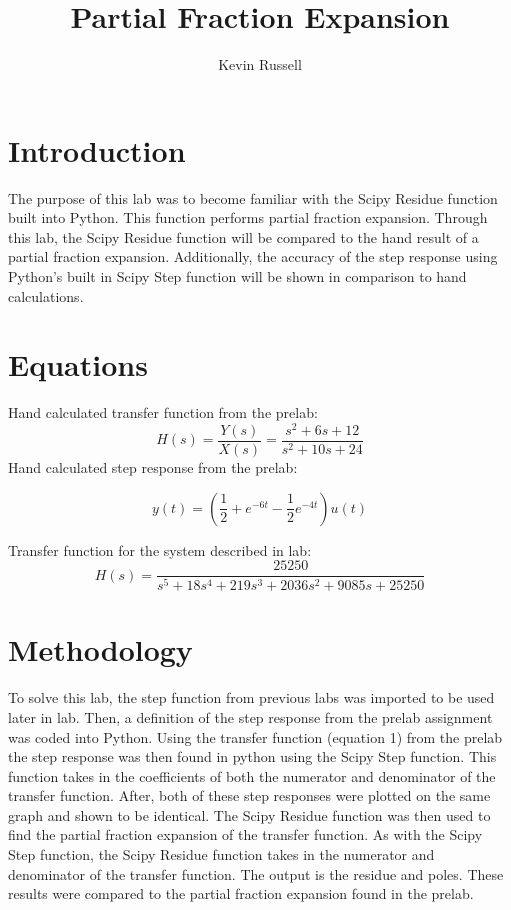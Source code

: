 \documentclass[12pt, titlepage]{article}
\author{Kevin Russell}
\title{Partial Fraction Expansion}
\date{\parbox{\linewidth}{\centering%
  \experimentDate
  \endgraf\bigskip
  \className\ -- Section \sectionNumber\
}}
\begin{document}
 \newpage
	    \maketitle
    
    \newpage
        \tableofcontents
        
   \newpage
        \section{Introduction}
       The purpose of this lab was to become familiar with the Scipy Residue function built into Python.  This function performs partial fraction expansion.  Through this lab, the Scipy Residue function will be compared to the hand result of a partial fraction expansion.  Additionally, the accuracy of the step response using Python's built in Scipy Step function will be shown in comparison to hand calculations.
        
        \section{Equations}
        Hand calculated transfer function from the prelab:
             \begin{equation}
                H(s)= \frac{Y(s)}{X(s)}=\frac{s^2+6s+12}{s^2+10s+24}
            \end{equation}
        Hand calculated step response from the prelab:
        
            \begin{equation}
                 y(t) = (\frac{1}{2}+e^{-6t}-\frac{1}{2}e^{-4t})u(t)
            \end{equation}
            
        Transfer function for the system described in lab:
            \begin{equation}
                H(s) = \frac{25250}{s^5+18s^4+219s^3+2036s^2+9085s+25250}
            \end{equation}
        
        \section{Methodology}
        To solve this lab, the step function from previous labs was imported to be used later in lab.  Then, a definition of the step response from the prelab assignment was coded into Python.  Using the transfer function (equation 1) from the prelab the step response was then found in python using the Scipy Step function.  This function takes in the coefficients of both the numerator and denominator of the transfer function.  After, both of these step responses were plotted on the same graph and shown to be identical.  The Scipy Residue function was then used to find the partial fraction expansion of the transfer function.  As with the Scipy Step function, the Scipy Residue function takes in the numerator and denominator of the transfer function.  The output is the residue and poles.  These results were compared to the partial fraction expansion found in the prelab.
       
\end{document}
